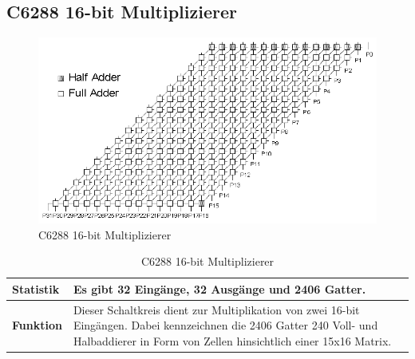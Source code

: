 \subsection*{C6288 16-bit Multiplizierer}
\label{sec:c6288}
\begin{figure}[bth]
	\centering
	\includegraphics[scale=0.5]{./img/c6288}
	\caption[C6288 16-bit Multiplizierer]{C6288 16-bit Multiplizierer \cite{h1999}}
	\label{fig:c6288}
\end{figure}
\begin{table}[bth]
	\centering
	\caption{C6288 16-bit Multiplizierer}
	\label{tab:c6288}
	\begin{tabular}{ | p{2cm} | p{12cm} |}
		\hline
		\textbf{Statistik} & Es gibt 32 Eingänge, 32 Ausgänge und 2406 Gatter. \\\hline
		\textbf{Funktion} & Dieser Schaltkreis dient zur Multiplikation von zwei 16-bit Eingängen. Dabei kennzeichnen die 2406 Gatter 240 Voll- und Halbaddierer in Form von Zellen hinsichtlich einer 15x16 Matrix.\\\hline
	\end{tabular}
\end{table}
\newpage
